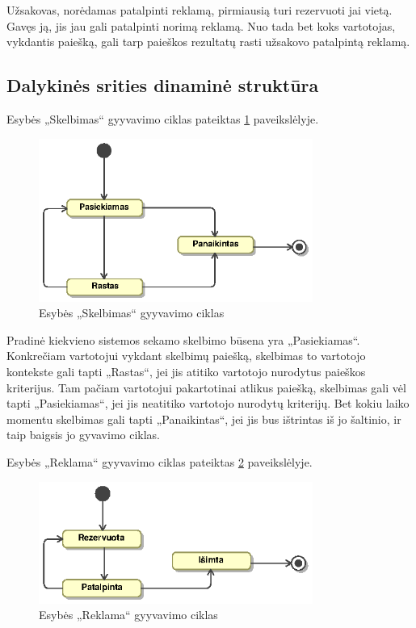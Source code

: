 \documentclass[12pt]{article}
\begin{document}
	Užsakovas, norėdamas patalpinti reklamą, pirmiausią turi rezervuoti jai vietą. Gavęs ją, jis jau gali patalpinti norimą reklamą. Nuo tada bet koks vartotojas, vykdantis paiešką, gali tarp paieškos rezultatų rasti užsakovo patalpintą reklamą.
	\pagebreak
	
	\subsection{Dalykinės srities dinaminė struktūra}
	
	Esybės „Skelbimas“ gyyvavimo ciklas pateiktas \ref{AdvertState} paveikslėlyje.
	
	\begin{figure}[h]
		\begin{center}
			\includegraphics[width=0.8\textwidth]{SkelbimoBusena.eps}
			\caption{Esybės „Skelbimas“ gyyvavimo ciklas\label{AdvertState}}
		\end{center}
	\end{figure}
	
	Pradinė kiekvieno sistemos sekamo skelbimo būsena yra „Pasiekiamas“. Konkrečiam vartotojui vykdant skelbimų paiešką, skelbimas to vartotojo kontekste gali tapti „Rastas“, jei jis atitiko vartotojo nurodytus paieškos kriterijus. Tam pačiam vartotojui pakartotinai atlikus paiešką, skelbimas gali vėl tapti „Pasiekiamas“, jei jis neatitiko vartotojo nurodytų kriterijų. Bet kokiu laiko momentu skelbimas gali tapti „Panaikintas“, jei jis bus ištrintas iš jo šaltinio, ir taip baigsis jo gyvavimo ciklas.
	\pagebreak	
	
	Esybės „Reklama“ gyyvavimo ciklas pateiktas \ref{AdState} paveikslėlyje.
	
	\begin{figure}[h]
		\begin{center}
			\includegraphics[width=0.8\textwidth]{ReklamosBusena.eps}
			\caption{Esybės „Reklama“ gyyvavimo ciklas\label{AdState}}
		\end{center}
	\end{figure}
	
\end{document}
